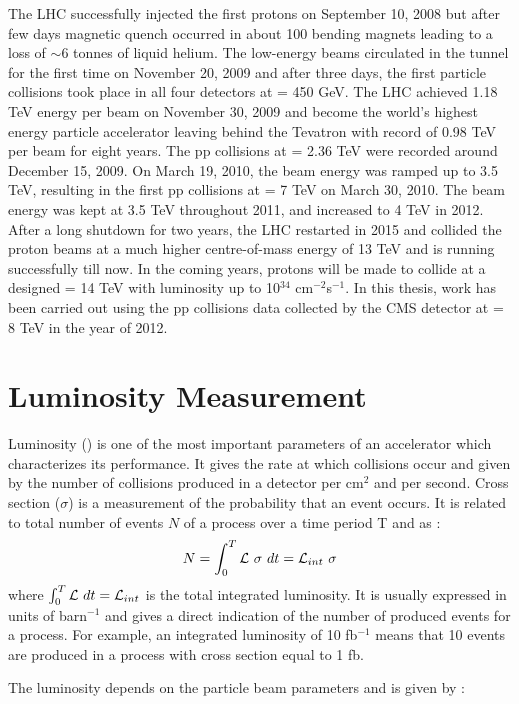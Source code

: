 The LHC successfully injected the first protons on September 10, 2008 but after few days magnetic quench occurred in about 100 bending magnets leading to a loss of $\sim$6 tonnes of liquid helium. The low-energy beams circulated in the tunnel for the first time on November 20, 2009 and after three days, the first particle collisions took place in all four detectors at \cme = 450 GeV. The LHC achieved 1.18 TeV energy per beam on November 30, 2009 and become the world’s highest energy particle accelerator leaving behind the Tevatron with record of 0.98 TeV per beam for eight years. The pp collisions at \cme = 2.36 TeV were recorded around December 15, 2009. On March 19, 2010, the beam energy was ramped up to 3.5 TeV, resulting in the first pp collisions at \cme = 7 TeV on March 30, 2010. The beam energy was kept at 3.5 TeV throughout 2011, and increased to 4 TeV in 2012. After a long shutdown for two years, the LHC restarted in 2015 and collided the proton beams at a much higher centre-of-mass energy of 13 TeV and is running successfully till now. In the coming years, protons will be made to collide at a designed \cme = 14 TeV with luminosity up to 10$^{34}$ cm$^{-2}$s$^{-1}$. In this thesis, work has been carried out using the pp collisions data collected by the CMS detector at \cme = 8 TeV in the year of 2012.

\section{Luminosity Measurement}
Luminosity (\lumi) is one of the most important parameters of an accelerator which characterizes its performance. It gives the rate at which collisions occur and given by the number of collisions produced in a detector per cm$^2$ and per second. Cross section ($\sigma$) is a measurement of the probability that an event occurs. It is related to total number of events $N$ of a process over a time period T and \lumi as :
\begin{equation}
N = \int_{0}^{T} \mathcal{L}~\sigma~dt = \mathcal{L}_{int}~\sigma
\end{equation}
where $\int_{0}^{T} \mathcal{L}~dt = \mathcal{L}_{int}$ is the total integrated luminosity. It is usually expressed in units of barn$^{-1}$ and gives a direct indication of the number of produced events for a process. For example, an integrated luminosity of 10 fb$^{-1}$ means that 10 events are produced in a process with cross section equal to 1 fb.

The luminosity depends on the particle beam parameters and is given by :

